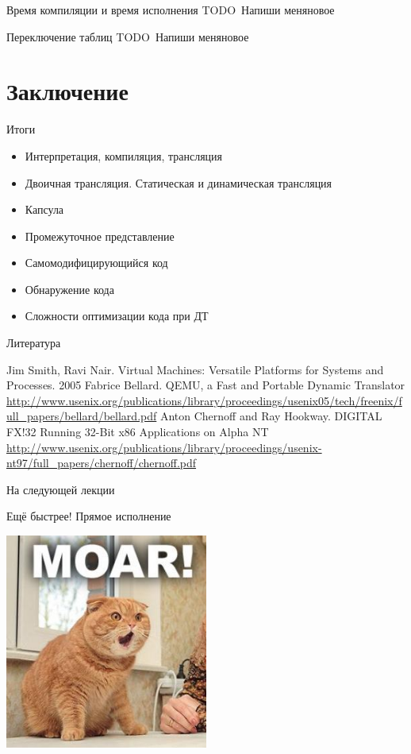 \documentclass{beamer}
\newcommand{\todo}[1][Напиши меня]{{\color{red}TODO\ #1}}
\begin{document}
\begin{frame}{Время компиляции и время исполнения}
\todo новое
\end{frame}

\begin{frame}{Переключение таблиц}
\todo новое
\end{frame}

\section{Заключение}

\begin{frame}{Итоги}
\begin{itemize}
\item Интерпретация, компиляция, трансляция
\item Двоичная трансляция. Статическая и динамическая трансляция
\item Капсула
\item Промежуточное представление
\item Самомодифицирующийся код
\item Обнаружение кода
\item Сложности оптимизации кода при ДТ
\end{itemize}
\end{frame}


\begin{frame}[allowframebreaks]{Литература}
\begin{thebibliography}{99}
     Jim Smith, Ravi Nair. Virtual Machines: Versatile Platforms for Systems and Processes. 2005
     Fabrice Bellard. QEMU, a Fast and Portable Dynamic Translator \url{http://www.usenix.org/publications/library/proceedings/usenix05/tech/freenix/full_papers/bellard/bellard.pdf}
     Anton Chernoff and Ray Hookway. {DIGITAL FX!32} Running 32-Bit x86 Applications on {Alpha} {NT} \url{http://www.usenix.org/publications/library/proceedings/usenix-nt97/full_papers/chernoff/chernoff.pdf}
\end{thebibliography}
\end{frame}


\begin{frame}{На следующей лекции}
\centering

Ещё быстрее! Прямое исполнение
\vfill

\includegraphics[width=0.5\textwidth]{./moar}
\end{frame}
\end{document}
